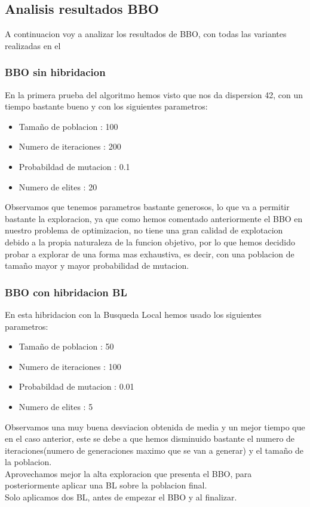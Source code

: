 \documentclass{article}
\begin{document}
\newpage
\subsection{Analisis resultados BBO}
A continuacion voy a analizar los resultados de BBO, con todas las variantes realizadas en el
\subsubsection{BBO sin hibridacion}
En la primera prueba del algoritmo hemos visto que nos da dispersion 42, con un tiempo bastante bueno y con los siguientes parametros:
\begin{itemize}
	\item{Tamaño de poblacion : 100}
	\item{Numero de iteraciones : 200}
	\item{Probabildad de mutacion : 0.1}
	\item{Numero de elites : 20}
\end{itemize}
\vspace{3mm}
Observamos que tenemos parametros bastante generosos, lo que va a permitir bastante la exploracion, ya que como hemos 
comentado anteriormente el BBO en nuestro problema de optimizacion, no tiene una gran calidad de explotacion 
debido a la propia naturaleza de la funcion objetivo, por lo que hemos decidido probar a explorar de una forma 
mas exhaustiva, es decir, con una poblacion de tamaño mayor y mayor probabilidad de mutacion.

\vspace{3mm}
\subsubsection{BBO con hibridacion BL}
En esta hibridacion con la Busqueda Local hemos usado los siguientes parametros:
\begin{itemize}
	\item{Tamaño de poblacion : 50}
	\item{Numero de iteraciones : 100}
	\item{Probabildad de mutacion : 0.01}
	\item{Numero de elites : 5}
\end{itemize}

\vspace{3mm}
Observamos una muy buena desviacion obtenida de media y un mejor tiempo que en el caso anterior, este se debe a que hemos 
disminuido bastante el numero de iteraciones(numero de generaciones maximo que se van a generar) y el tamaño de la poblacion.\\
Aprovechamos mejor la alta exploracion que presenta el BBO, para posteriormente aplicar una BL sobre la poblacion final.\\
Solo aplicamos dos BL, antes de empezar el BBO y al finalizar.
\end{document}

